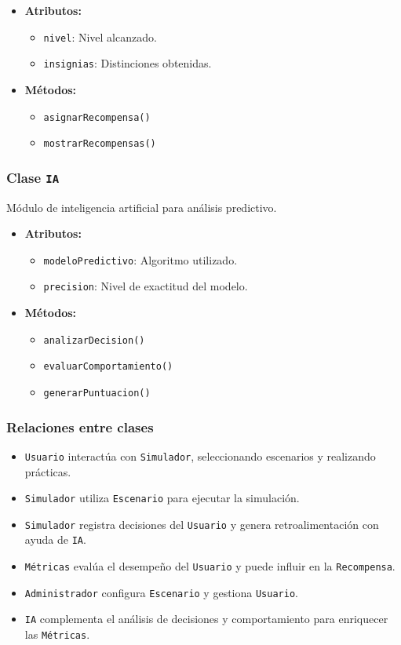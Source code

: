 \documentclass[12pt]{article}
\begin{document}
\begin{itemize}
    \item \textbf{Atributos:}
    \begin{itemize}
        \item \texttt{nivel}: Nivel alcanzado.
        \item \texttt{insignias}: Distinciones obtenidas.
    \end{itemize}
    \item \textbf{Métodos:}
    \begin{itemize}
        \item \texttt{asignarRecompensa()}
        \item \texttt{mostrarRecompensas()}
    \end{itemize}
\end{itemize}

\subsubsection*{Clase \texttt{IA}}
Módulo de inteligencia artificial para análisis predictivo.

\begin{itemize}
    \item \textbf{Atributos:}
    \begin{itemize}
        \item \texttt{modeloPredictivo}: Algoritmo utilizado.
        \item \texttt{precision}: Nivel de exactitud del modelo.
    \end{itemize}
    \item \textbf{Métodos:}
    \begin{itemize}
        \item \texttt{analizarDecision()}
        \item \texttt{evaluarComportamiento()}
        \item \texttt{generarPuntuacion()}
    \end{itemize}
\end{itemize}

\subsubsection*{Relaciones entre clases}
\begin{itemize}
    \item \texttt{Usuario} interactúa con \texttt{Simulador}, seleccionando escenarios y realizando prácticas.
    \item \texttt{Simulador} utiliza \texttt{Escenario} para ejecutar la simulación.
    \item \texttt{Simulador} registra decisiones del \texttt{Usuario} y genera retroalimentación con ayuda de \texttt{IA}.
    \item \texttt{Métricas} evalúa el desempeño del \texttt{Usuario} y puede influir en la \texttt{Recompensa}.
    \item \texttt{Administrador} configura \texttt{Escenario} y gestiona \texttt{Usuario}.
    \item \texttt{IA} complementa el análisis de decisiones y comportamiento para enriquecer las \texttt{Métricas}.
\end{itemize}
\end{document}
